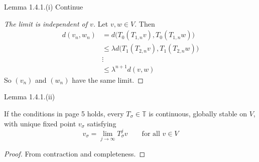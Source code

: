 \documentclass[aspectratio=169]{beamer} %
\begin{document}
\begin{frame}{Lemma 1.4.1.(i) Continue}
    \begin{proof}[The limit is independent of $v$]
        Let $v,w\in V$. Then
        \begin{align*}
            d(v_n,w_n) &= d\bigg(T_0 (T_{1,n}v),T_0(T_{1,n}w)\bigg)\\
            &\le \lambda d\bigg(T_1(T_{2,n} v), T_1(T_{2,n}w)\bigg)\tag{contraction}\\
        &\vdots\\
        &\le\lambda^{n+1}d(v,w)
        \end{align*}   
        So $(v_n)$ and $(w_n)$ have the same limit.
    \end{proof}
\end{frame}
\begin{frame}{Lemma 1.4.1.(ii)}
\begin{Lemma}
    If the conditions in page 5 holds, every $T_\sigma\in\mathbb{T}$ is continuous, globally stable on $V$, with unique fixed point $v_\sigma$ satisfying
    $$
    v_\sigma = \lim_{j\to\infty} T_\sigma^j v\qquad\text{for all $v\in V$}
    $$
\end{Lemma}
\begin{proof}
    From contraction and completeness.
\end{proof}
    
\end{frame}
\end{document}
